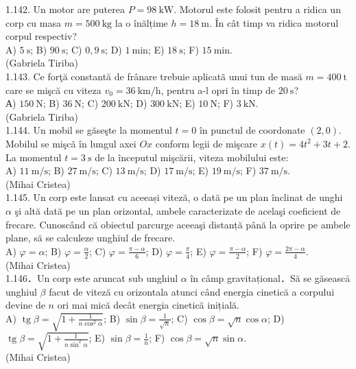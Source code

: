 1.142. Un motor are puterea $P=98 \mathrm{~kW}$. Motorul este folosit pentru a ridica un corp cu masa $m=500 \mathrm{~kg}$ la o înălțime $h=18 \mathrm{~m}$. În cât timp va ridica motorul corpul respectiv?\\ A) $5 \mathrm{~s}$; B) $90 \mathrm{~s}$; C) $0,9 \mathrm{~s}$; D) $1 \mathrm{~min}$; E) $18 \mathrm{~s}$; F) $15 \mathrm{~min}$.\\ (Gabriela Tiriba)\\

1.143. Ce forţă constantă de frânare trebuie aplicatã unui tun de masă $m=400 \mathrm{~t}$ care se mişcă cu viteza $v_{0}=36 \mathrm{~km} / \mathrm{h}$, pentru a-l opri în timp de $20 \mathrm{~s}$?\\ А) $150 \mathrm{~N}$; B) $36 \mathrm{~N}$; C) $200 \mathrm{~kN}$; D) $300 \mathrm{~kN}$; E) $10 \mathrm{~N}$; F) $3 \mathrm{~kN}$.\\ (Gabriela Tiriba)\\

1.144. Un mobil se găseşte la momentul $t=0$ în punctul de coordonate $(2,0)$. Mobilul se mişcã în lungul axei $Ox$ conform legii de mişcare $x(t)=4 t^{2}+3 t+2$. La momentul $t=3 \mathrm{~s}$ de la începutul mişcării, viteza mobilului este:\\ A) $11 \mathrm{~m} / \mathrm{s}$; B) $27 \mathrm{~m} / \mathrm{s}$; C) $13 \mathrm{~m} / \mathrm{s}$; D) $17 \mathrm{~m} / \mathrm{s}$; E) $19 \mathrm{~m} / \mathrm{s}$; F) $37 \mathrm{~m} / \mathrm{s}$.\\ (Mihai Cristea)\\

1.145. Un corp este lansat cu aceeași viteză, o dată pe un plan înclinat de unghi $\alpha$ şi altă dată pe un plan orizontal, ambele caracterizate de acelaşi coeficient de frecare. Cunoscând că obiectul parcurge aceeaşi distanță până la oprire pe ambele plane, să se calculeze unghiul de frecare.\\ A) $\varphi=\alpha$; B) $\varphi=\frac{\alpha}{2}$; C) $\varphi=\frac{\pi-\alpha}{6}$; D) $\varphi=\frac{\pi}{4}$; E) $\varphi=\frac{\pi-\alpha}{2}$; F) $\varphi=\frac{2 \pi-\alpha}{4}$.\\ (Mihai Cristea)\\

1.146．Un corp este aruncat sub unghiul $\alpha$ în câmp gravitațional．Să se găseascā unghiul $\beta$ facut de viteză cu orizontala atunci când energia cinetică a corpului devine de $n$ ori mai mică decât energia cinetică inițială.\\ A) $\operatorname{tg} \beta=\sqrt{1+\frac{1}{n \cos ^{2} \alpha}}$; B) $\sin \beta=\frac{1}{\sqrt{n}}$; C) $\cos \beta=\sqrt{n} \cos \alpha$; D) $\operatorname{tg} \beta=\sqrt{1+\frac{1}{n \sin ^{2} \alpha}}$; E) $\sin \beta=\frac{1}{n}$; F) $\cos \beta=\sqrt{n} \sin \alpha$.\\ (Mihai Cristea)\\

